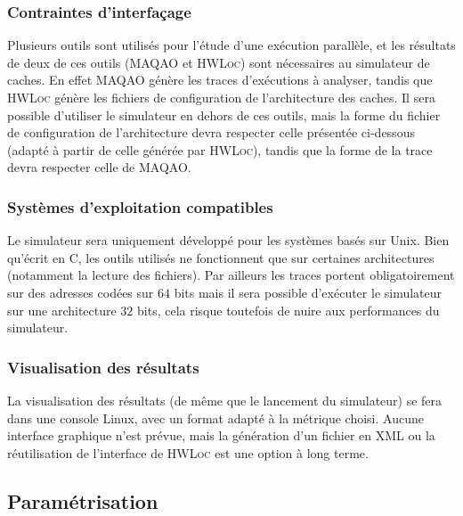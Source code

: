 \subsubsection{Contraintes d'interfaçage}

Plusieurs outils sont utilisés pour l'étude d'une exécution parallèle, et les résultats de deux de ces outils (\textsc{MAQAO} et \textsc{HWLoc}) sont nécessaires au simulateur de caches. En effet \textsc{MAQAO} génère les traces d'exécutions à analyser, tandis que \textsc{HWLoc}
génère les fichiers de configuration de l'architecture des caches. Il sera possible d'utiliser le simulateur en dehors de ces outils, mais la forme du fichier de configuration de l'architecture devra respecter celle présentée ci-dessous (adapté à partir de celle générée par \textsc{HWLoc}), tandis que la forme de la trace devra respecter celle de \textsc{MAQAO}.

\subsubsection{Systèmes d'exploitation compatibles}

Le simulateur sera uniquement développé pour les systèmes basés sur Unix. Bien qu'écrit en \textsc{C}, les outils utilisés ne fonctionnent que sur certaines architectures (notamment la lecture des fichiers). Par ailleurs les traces portent obligatoirement sur des adresses codées sur $64$ bits mais il sera possible d'exécuter le simulateur sur une architecture $32$ bits, cela risque toutefois de nuire aux performances du simulateur.

\subsubsection{Visualisation des résultats}

La visualisation des résultats (de même que le lancement du simulateur) se fera dans une console Linux, avec un format adapté à la métrique choisi. Aucune interface graphique n'est prévue, mais la génération d'un fichier en \textsc{XML} ou la réutilisation de l'interface de \textsc{HWLoc} est une option à long terme.

\subsection{Paramétrisation}
\label{param}

